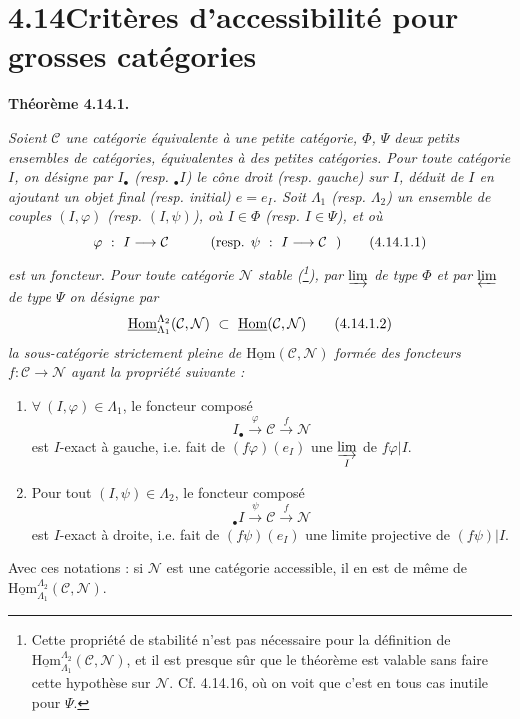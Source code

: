 \documentclass[11pt]{article}
\newcommand{\printedpage}[1]{\marginpar{\footnotesize p.~#1}}
\newcommand{\msp}[1]{\marginpar{\footnotesize [#1]}}
\newcommand{\uHom}{\underline{\mathrm{Hom}}}
\begin{document}
\msp{page 370}

\section*{4.14\quad Critères d'accessibilité pour grosses catégories}

\noindent\textbf{Théorème 4.14.1.} {\itshape Soient $\mathcal{C}$ une catégorie équivalente à une petite catégorie, $\Phi$, $\Psi$ deux petits ensembles de catégories, équivalentes à des petites catégories. Pour toute catégorie $I$, on désigne par $I_{\bullet}$ (resp. ${}_{\bullet}I$) le cône droit (resp. gauche) sur $I$, déduit de $I$ en ajoutant un objet final (resp. initial) $e=e_I$. Soit $\Lambda_1$ (resp. $\Lambda_2$) un ensemble de couples $(I,\varphi)$ (resp. $(I,\psi)$), où $I\in\Phi$ (resp. $I\in\Psi$), et où
\[
\varphi\ :\ I \longrightarrow \mathcal{C} \qquad\quad \text{(resp. }\psi\ :\ I \longrightarrow \mathcal{C}\ \ \text{)} \tag*{\textup{(4.14.1.1)}}
\]
est un foncteur. Pour toute catégorie $\mathcal{N}$ stable (\footnote[163]{Cette propriété de stabilité n'est pas nécessaire pour la définition de $\uHom^{\Lambda_2}_{\Lambda_1}(\mathcal{C},\mathcal{N})$, et il est presque sûr que le théorème est valable sans faire cette hypothèse sur $\mathcal{N}$. Cf. 4.14.16, où on voit que c'est en tous cas inutile pour $\Psi$.}), par $\varinjlim$ de type $\Phi$ et par $\varprojlim$ de type $\Psi$ on désigne par
\[
\uHom^{\Lambda_2}_{\Lambda_1}(\mathcal{C},\mathcal{N})\ \subset\ \uHom(\mathcal{C},\mathcal{N}) \tag*{\textup{(4.14.1.2)}}
\]
la sous-catégorie strictement pleine de $\uHom(\mathcal{C},\mathcal{N})$ formée des foncteurs $f:\mathcal{C}\longrightarrow\mathcal{N}$ ayant la propriété suivante :
\begin{enumerate}[leftmargin=2.5em]
\item[\textit{a)}] $\forall\ (I,\varphi)\in\Lambda_1$, le foncteur composé
\[
I_{\bullet} \xrightarrow{\ \varphi\ } \mathcal{C} \xrightarrow{\ f\ } \mathcal{N}
\]
est $I$-exact à gauche, i.e. fait de $(f\varphi)(e_I)$ une $\varinjlim\limits_{I}$ de $f\varphi|I$.
\printedpage{141}
\msp{page 371}
\item[\textit{b)}] Pour tout $(I,\psi)\in\Lambda_2$, le foncteur composé
\[
{}_{\bullet}I \xrightarrow{\ \psi\ } \mathcal{C} \xrightarrow{\ f\ } \mathcal{N}
\]
est $I$-exact à droite, i.e. fait de $(f\psi)(e_I)$ une limite projective de $(f\psi)|I$.
\end{enumerate}
\noindent Avec ces notations : si $\mathcal{N}$ est une catégorie accessible, il en est de même de $\uHom^{\Lambda_2}_{\Lambda_1}(\mathcal{C},\mathcal{N})$.}
\end{document}
